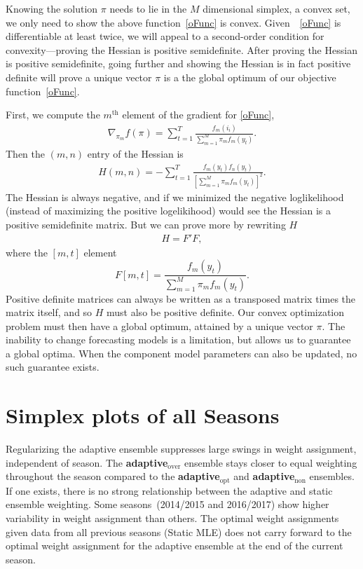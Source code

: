 \documentclass[sagev,times,Review,10pt]{sagej}
\def\l{\left}
\def\r{\right}
\newcommand{\f}{\frac}
\def\adaptNon{\textbf{adaptive$_{\text{non}}$ }}
\def\adaptOpt{\textbf{adaptive$_{\text{opt}}$ }}
\def\adaptOver{\textbf{adaptive$_{\text{over}}$ }}
\begin{document}
\begin{appendix}
Knowing the solution $\pi$ needs to lie in the $M$ dimensional simplex, a convex set, we only need to show the above function~\eqref{oFunc} is convex.
Given~~\eqref{oFunc} is differentiable at least twice, we will appeal to a second-order condition for convexity---proving the Hessian is positive semidefinite.
After proving the Hessian is positive semidefinite, going further and showing the Hessian is in fact positive definite will prove a unique vector $\pi$ is a the global optimum of our objective function~\eqref{oFunc}.

First, we compute the $m^{\text{th}}$ element of the gradient for \eqref{oFunc},
\begin{align*}
  \nabla_{\pi_m} f(\pi) = \sum_{t=1}^{T} \f{f_{m}(i_{i})}{\sum_{m=1}^{M} \pi_mf_{m}(y_{t}) }.
\end{align*}
Then the $(m,n)$ entry of the Hessian is
\begin{align*}
  H(m,n) = - \sum_{t=1}^{T} \f{ f_{m}(y_{t}) f_{n}(y_{t})}{ \l[\sum_{m=1}^{M} \pi_mf_{m}(y_{t})  \r]^{2} }.
\end{align*}
The Hessian is always negative, and if we minimized the negative loglikelihood (instead of maximizing the positive logelikihood) would see the Hessian is a positive semidefinite matrix.
But we can prove more by rewriting $H$
\begin{align*}
 H = F'F,
\end{align*}
where the $[m,t]$ element
\begin{equation*}
  F[m,t] = \f{f_{m}(y_{t})}{\sum_{m=1}^{M}\pi_mf_{m}(y_{t})}.
\end{equation*}
Positive definite matrices can always be written as a transposed matrix times the matrix itself, and so $H$ must also be positive definite.
Our convex optimization problem must then have a global optimum, attained by a unique vector $\pi$.
The inability to change forecasting models is a limitation, but allows us to guarantee a global optima.
When the component model parameters can also be updated, no such guarantee exists.

\clearpage
\section{Simplex plots of all Seasons}
\label{simplexplot}

Regularizing the adaptive ensemble suppresses large swings in weight assignment, independent of season.
The \adaptOver ensemble stays closer to equal weighting throughout the season compared to the \adaptOpt and \adaptNon ensembles.
If one exists, there is no strong relationship between the adaptive and static ensemble weighting.
Some seasons~(2014/2015 and 2016/2017) show higher variability in weight assignment than others.
The optimal weight assignments given data from all previous seasons (Static MLE) does not carry forward to the optimal weight assignment for the adaptive ensemble at the end of the current season.  


\end{appendix}
\end{document}
